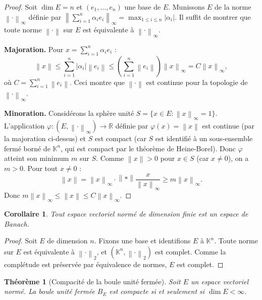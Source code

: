 \documentclass[a4paper,12pt]{book}
\newcommand{\R}{\mathbb{R}}
\newcommand{\K}{\mathbb{K}}
\newcommand{\norm}[1]{\left\| #1 \right\|}
\newcommand{\abs}[1]{\left| #1 \right|}
\theoremstyle{definition}
\theoremstyle{plain}
\newtheorem{theoreme}[definition]{Théorème}
\newtheorem{corollaire}[definition]{Corollaire}
\theoremstyle{remark}
\begin{document}
\begin{proof}
Soit $\dim E = n$ et $(e_1, \ldots, e_n)$ une base de $E$. Munissons $E$ de la norme $\norm{\cdot}_\infty$ définie par $\norm{\sum_{i=1}^n \alpha_i e_i}_\infty = \max_{1\leq i\leq n} \abs{\alpha_i}$. Il suffit de montrer que toute norme $\norm{\cdot}$ sur $E$ est équivalente à $\norm{\cdot}_\infty$.

\textbf{Majoration.} Pour $x = \sum_{i=1}^n \alpha_i e_i$ :
\[
    \norm{x} \leq \sum_{i=1}^n \abs{\alpha_i}\norm{e_i} \leq \left(\sum_{i=1}^n \norm{e_i}\right) \norm{x}_\infty = C \norm{x}_\infty,
\]
où $C = \sum_{i=1}^n \norm{e_i}$. Ceci montre que $\norm{\cdot}$ est continue pour la topologie de $\norm{\cdot}_\infty$.

\textbf{Minoration.} Considérons la sphère unité $S = \{x \in E : \norm{x}_\infty = 1\}$. L'application $\varphi : (E, \norm{\cdot}_\infty) \to \R$ définie par $\varphi(x) = \norm{x}$ est continue (par la majoration ci-dessus) et $S$ est compact (car $S$ est identifié à un sous-ensemble fermé borné de $\K^n$, qui est compact par le théorème de Heine-Borel). Donc $\varphi$ atteint son minimum $m$ sur $S$. Comme $\norm{x} > 0$ pour $x \in S$ (car $x \neq 0$), on a $m > 0$. Pour tout $x \neq 0$ :
\[
    \norm{x} = \norm{x}_\infty \cdot \norm*{\frac{x}{\norm{x}_\infty}} \geq m \norm{x}_\infty.
\]
Donc $m \norm{x}_\infty \leq \norm{x} \leq C \norm{x}_\infty$.
\end{proof}

\begin{corollaire}\label{cor:dim-finie-banach}
Tout espace vectoriel normé de dimension finie est un espace de Banach.
\end{corollaire}

\begin{proof}
Soit $E$ de dimension $n$. Fixons une base et identifions $E$ à $\K^n$. Toute norme sur $E$ est équivalente à $\norm{\cdot}_2$, et $(\K^n, \norm{\cdot}_2)$ est complet. Comme la complétude est préservée par équivalence de normes, $E$ est complet.
\end{proof}

\begin{theoreme}[Compacité de la boule unité fermée]\label{thm:compacite-boule}
Soit $E$ un espace vectoriel normé. La boule unité fermée $B_E$ est compacte si et seulement si $\dim E < \infty$.
\end{theoreme}
\end{document}
